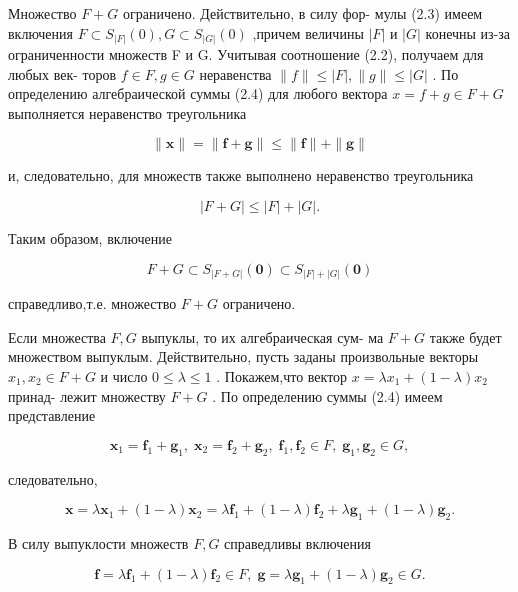 \documentclass[8pt]{extarticle}
\begin{document}
Множество \(F + G\) ограничено. Действительно, в силу фор- мулы (2.3) имеем включения \(F \subset  {S}_{\left| F\right| }\left( 0\right) ,G \subset  {S}_{\left| G\right| }\left( 0\right)\) ,причем величины \(\left| F\right|\) и \(\left| G\right|\) конечны из-за ограниченности множеств F и G. Учитывая соотношение (2.2), получаем для любых век- торов \(f \in  F,g \in  G\) неравенства \(\parallel f\parallel  \leq  \left| F\right| ,\parallel g\parallel  \leq  \left| G\right|\) . По определению алгебраической суммы (2.4) для любого вектора \(x = f + g \in  F + G\) выполняется неравенство треугольника

\[
\parallel \mathbf{x}\parallel  = \parallel \mathbf{f} + \mathbf{g}\parallel  \leq  \parallel \mathbf{f}\parallel  + \parallel \mathbf{g}\parallel
\]

и, следовательно, для множеств также выполнено неравенство треугольника

\[
\left| {F + G}\right|  \leq  \left| F\right|  + \left| G\right| .
\]

Таким образом, включение

\[
F + G \subset  {S}_{\left| F + G\right| }\left( \mathbf{0}\right)  \subset  {S}_{\left| F\right|  + \left| G\right| }\left( \mathbf{0}\right)
\]

справедливо,т.е. множество \(F + G\) ограничено.

Если множества \(F,G\) выпуклы, то их алгебраическая сум- ма \(F + G\) также будет множеством выпуклым. Действительно, пусть заданы произвольные векторы \({x}_{1},{x}_{2} \in  F + G\) и число \(0 \leq  \lambda  \leq  1\) . Покажем,что вектор \(x = \lambda {x}_{1} + \left( {1 - \lambda }\right) {x}_{2}\) принад- лежит множеству \(F + G\) . По определению суммы (2.4) имеем представление

\[
{\mathbf{x}}_{1} = {\mathbf{f}}_{1} + {\mathbf{g}}_{1},\;{\mathbf{x}}_{2} = {\mathbf{f}}_{2} + {\mathbf{g}}_{2},\;{\mathbf{f}}_{1},{\mathbf{f}}_{2} \in  F,\;{\mathbf{g}}_{1},{\mathbf{g}}_{2} \in  G,
\]

следовательно,

\[
\mathbf{x} = \lambda {\mathbf{x}}_{1} + \left( {1 - \lambda }\right) {\mathbf{x}}_{2} = \lambda {\mathbf{f}}_{1} + \left( {1 - \lambda }\right) {\mathbf{f}}_{2} + \lambda {\mathbf{g}}_{1} + \left( {1 - \lambda }\right) {\mathbf{g}}_{2}.
\]

В силу выпуклости множеств \(F,G\) справедливы включения

\[
\mathbf{f} = \lambda {\mathbf{f}}_{1} + \left( {1 - \lambda }\right) {\mathbf{f}}_{2} \in  F,\;\mathbf{g} = \lambda {\mathbf{g}}_{1} + \left( {1 - \lambda }\right) {\mathbf{g}}_{2} \in  G.
\]
\end{document}
